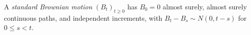 
A \emph{standard Brownian motion} $(B_t)_{t\ge0}$ has $B_0=0$ almost surely, almost surely continuous paths, and independent increments, with $B_t-B_s\sim N(0,t-s)$ for $0\le s<t$.
